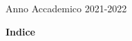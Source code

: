 \documentclass{article}
\begin{document}
        \begin{center}
            \vspace*{\fill}Anno Accademico 2021-2022
        \end{center}
        
        \break
        
        
        
        
        
        \begin{adjustwidth}{0pt}{0pt}{\huge\textbf{Indice}}\end{adjustwidth}
        \vspace{-20mm}
        
        \tableofcontents

        
\end{document}
